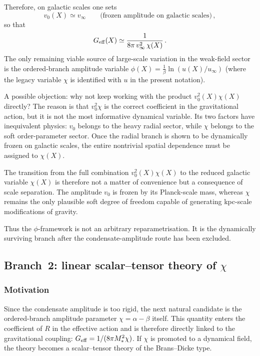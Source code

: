 \documentclass[11pt,a4paper]{article}
\numberwithin{equation}{section}
\begin{document}
Therefore, on galactic scales one sets
\begin{equation}
v_0(X) \simeq v_\infty
\qquad\text{(frozen amplitude on galactic scales)}\,,
\end{equation}
so that
\begin{equation}
G_{\rm eff}(X) \simeq
\frac{1}{8\pi\,v_\infty^2\,\chi(X)}\,.
\end{equation}
The only remaining viable source of large-scale variation
in the weak-field sector is the ordered-branch amplitude variable
$\phi(X) = \frac{1}{\beta}\ln(u(X)/u_\infty)$
(where the legacy variable $\chi$ is identified with $u$ in the present notation).

A possible objection: why not keep working with the product
$v_0^2(X)\chi(X)$ directly?
The reason is that $v_0^2\chi$ is the correct coefficient in
the gravitational action, but it is not the most informative
dynamical variable.
Its two factors have inequivalent physics: $v_0$ belongs to
the heavy radial sector, while $\chi$ belongs to the soft
order-parameter sector.
Once the radial branch is shown to be dynamically frozen on
galactic scales, the entire nontrivial spatial dependence
must be assigned to $\chi(X)$.

The transition from the full combination $v_0^2(X)\chi(X)$
to the reduced galactic variable $\chi(X)$ is therefore not a
matter of convenience but a consequence of scale separation.
The amplitude $v_0$ is frozen by its Planck-scale mass,
whereas $\chi$ remains the only plausible soft degree of
freedom capable of generating kpc-scale modifications of
gravity.

Thus the $\phi$-framework is not an arbitrary
reparametrisation.
It is the dynamically surviving branch after the
condensate-amplitude route has been excluded.


\subsection{Branch~2: linear scalar--tensor theory of $\chi$}
\label{app:lof:branch2}

\subsubsection{Motivation}

Since the condensate amplitude is too rigid, the next natural
candidate is the ordered-branch amplitude parameter
$\chi = \alpha - \beta$ itself. This quantity enters the
coefficient of $R$ in the effective action and is therefore
directly linked to the gravitational coupling:
$G_{\rm eff} = 1/(8\pi M_*^2\chi)$. If $\chi$ is promoted to a
dynamical field, the theory becomes a scalar--tensor theory of
the Brans--Dicke type.
\end{document}
